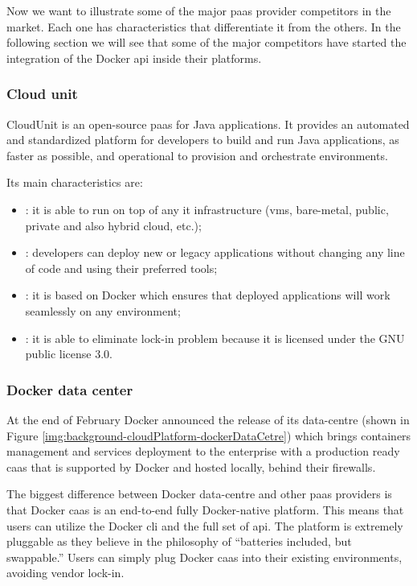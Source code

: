 Now we want to illustrate some of the major \ac{paas} provider competitors in the market. Each one 
has characteristics that differentiate it from the others. In the following section we will see that
some of the major competitors have started the integration of the Docker \ac{api} inside their platforms.

\subsubsection*{Cloud unit}
\label{sec:background-paas-example-cloudUnit}
CloudUnit \cite{cloudUnitHomepage} is an open-source \ac{paas} for Java applications. It provides an
automated and standardized platform for developers to build and run Java applications, as faster as
possible, and operational to provision and orchestrate environments.

Its main characteristics are:

\begin{itemize}
	\item{: it is able to run on top of any \acs{it} infrastructure
		(\ac{vm}s, bare-metal, public, private and also hybrid cloud, etc.);}
	\item{: developers can deploy new or legacy applications without changing any line
		of code and using their preferred tools;}
	\item{: it is based on Docker which ensures that deployed applications will
		work seamlessly on any environment;}
	\item{: it is able to eliminate lock-in problem because it is licensed under
		the GNU public license 3.0.}
\end{itemize}

\subsubsection*{Docker data center}
\label{sec:background-paas-example-dockerDataCentre}
At the end of February Docker announced \cite{dockerDataCentrePresentation} the release of its data-centre
\cite{dockerDataCentre} (shown in Figure \ref{img:background-cloudPlatform-dockerDataCetre}) which
brings containers management and services deployment to the enterprise
with a production ready \ac{caas} that is supported by Docker and hosted locally, behind their firewalls.

The biggest difference between Docker data-centre and other \ac{paas} providers is that Docker \ac{caas}
is an end-to-end fully Docker-native platform. This means that users can utilize the Docker \ac{cli}
and the full set of \acs{api}. The platform is extremely pluggable as they believe in the philosophy of
``batteries included, but swappable.'' Users can simply plug Docker \ac{caas} into their existing
environments, avoiding vendor lock-in.

